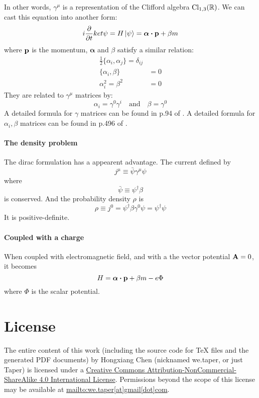 \documentclass{article}
\begin{document}
In other words, $\gamma^\mu$ is a representation of the Clifford algebra
$\mathrm{Cl}_{1,3}(\mathbb{R})$. We can cast this equation into another form:
\begin{equation}
    i\pdv{t} ket{\psi} = H \ket{\psi} = \bm{\alpha}\vdot\vb{p}+\beta m
\end{equation}
where $\vb{p}$ is the momentum, $\bm{\alpha}$ and $\beta$ satisfy a similar
relation:
\begin{align}
    \frac{1}{2}\{\alpha_i,\alpha_j\} = \delta_{ij} \\
    \{\alpha_i,\beta\} &= 0 \\
    \alpha_i^2 = \beta^2 &= 0
\end{align}
They are related to $\gamma^\mu$ matrices by:
\begin{equation}
    \alpha_i = \gamma^0 \gamma^i \quad\text{and}\quad
    \beta = \gamma^0
\end{equation}
A detailed formula for $\gamma$ matrices can be found in p.94 of
\cite{zee2010quantum}. A detailed formula for $\alpha_i,\beta$
matrices can be found in p.496 of \cite{Sakurai2011}.

\paragraph{The density problem} The dirac formulation has a appearent advantage.
The current defined by
\begin{equation}
    j^\mu \equiv \bar{\psi}\gamma^\mu\psi
\end{equation}
where
\begin{equation}
    \bar{\psi} \equiv \psi^\dagger \beta
\end{equation}
is conserved. And the probability density $\rho$ is
\begin{equation}
    \rho \equiv j^0 = \psi^\dagger \beta \gamma^0 \psi = \psi^\dagger \psi
\end{equation}
It is positive-definite.

\paragraph{Coupled with a charge} When coupled with electromagnetic
field, and with a the vector potential $\vb{A}=0$, it becomes
\begin{equation}
    H = \bm{\alpha}\vdot\vb{p} + \beta m - e \Phi
\end{equation}
where $\Phi$ is the scalar potential.

{}


\printnomenclature
\section{License}
The entire content of this work (including the source code
for TeX files and the generated PDF documents) by 
Hongxiang Chen (nicknamed we.taper, or just Taper) is
licensed under a 
\href{http://creativecommons.org/licenses/by-nc-sa/4.0/}{Creative 
Commons Attribution-NonCommercial-ShareAlike 4.0 International 
License}. Permissions beyond the scope of this 
license may be available at \url{mailto:we.taper[at]gmail[dot]com}.
\end{document}
